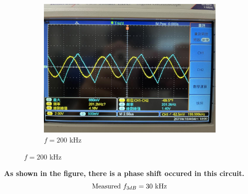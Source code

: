\documentclass{article}
\begin{document}
\begin{CJK*}{UTF8}{bkai}
\begin{center}
\begin{figure}[h]
\begin{subfigure}[b]{0.3\textwidth}
        \includegraphics[width=\textwidth]{noninv_200k.jpg}
        \caption{$f = 200$ \unit{\kilo\hertz}}
    \end{subfigure}
\end{figure}
\end{center}

\textbf{As shown in the figure, there is a phase shift occured in this circuit.}
\begin{equation*}
    \text{Measured } f_{3dB} = 30 \text{ \unit{\kilo\hertz}}
\end{equation*}

\end{CJK*}
\end{document}
